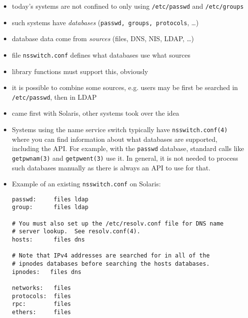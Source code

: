 \begin{slide}
\begin{itemize}
\item today's systems are not confined to only using
\texttt{/etc/passwd} and \texttt{/etc/groups}
\item such systems have \emph{databases} (\texttt{passwd, groups, protocols},
\dots)
\item database data come from \emph{sources} (files, DNS, NIS, LDAP, \dots)
\item file \texttt{nsswitch.conf} defines what databases use what sources
\item library functions must support this, obviously
\item it is possible to combine some sources, e.g. users may be first be searched
in \texttt{/etc/passwd}, then in LDAP
\item came first with Solaris, other systems took over the idea
\end{itemize}
\end{slide}

\label{name_service_switch}

\begin{itemize}
\item Systems using the name service switch typically have
\texttt{nsswitch.conf(4)} where you can find information about what databases
are supported, including the API.  For example, with the \texttt{passwd}
database, standard calls like \texttt{getpwnam(3)} and \texttt{getpwent(3)} use
it.  In general, it is not needed to process such databases manually as there is
always an API to use for that.
\item Example of an existing \texttt{nsswitch.conf} on Solaris:

\begin{verbatim}
passwd:     files ldap
group:      files ldap

# You must also set up the /etc/resolv.conf file for DNS name
# server lookup.  See resolv.conf(4).
hosts:      files dns

# Note that IPv4 addresses are searched for in all of the
# ipnodes databases before searching the hosts databases.
ipnodes:   files dns

networks:   files
protocols:  files
rpc:        files
ethers:     files
\end{verbatim}
\end{itemize}


